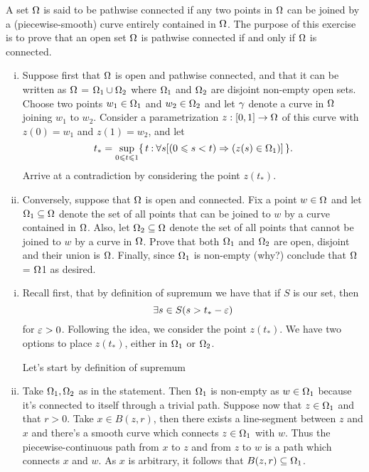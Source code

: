 \documentclass[12pt]{memoir}
\begin{document}
\begin{Ej}
    A set $\Omega$ is said to be pathwise connected if any two points in $\Omega$ can be joined by a (piecewise-smooth) curve entirely contained in $\Omega$. The purpose of this exercise is to prove that an open set $\Omega$ is pathwise connected if and only if $\Omega$ is connected.
    \begin{enumerate}[i)]
        \itemsep=-0.4em
        \item Suppose first that $\Omega$ is open and pathwise connected, and that it can be written as $\Omega$ = $\Omega_1\cup\Omega_2$ where $\Omega_1$ and $\Omega_2$ are disjoint non-empty open sets. Choose two points $w_1\in\Omega_1$ and $w_2\in\Omega_2$ and let $\gamma$ denote a curve in $\Omega$ joining $w_1$ to $w_2$. Consider a parametrization $z:\left\lbrack0,1\right\rbrack\to\Omega$ of this curve with $z(0) = w_1$ and $z(1) = w_2$, and let
        $$t_\ast = \sup_{0\leqslant t\leqslant 1}\{\,t\mathbin{:}\forall s [(0\leqslant s<t)\Rightarrow (z(s)\in\Omega_1)]\,\}.$$
        Arrive at a contradiction by considering the point $z(t_\ast)$.
        \item Conversely, suppose that $\Omega$ is open and connected. Fix a point $w\in\Omega$ and let $\Omega_1\subseteq\Omega$ denote the set of all points that can be joined to $w$ by a curve contained in $\Omega$. Also, let $\Omega_2\subseteq\Omega$ denote the set of all points that cannot be joined to $w$ by a curve in $\Omega$. Prove that both $\Omega_1$ and $\Omega_2$ are open, disjoint and their union is $\Omega$. Finally, since $\Omega_1$ is non-empty (why?) conclude that $\Omega$ = $\Omega$1 as desired.
    \end{enumerate}
    \end{Ej}

\begin{ptcbr}
    \begin{enumerate}[i)]
        \itemsep=-0.4em
        \item Recall first, that by definition of supremum we have that if $S$ is our set, then 
        $$\exists s\in S(s>t_\ast-\varepsilon)$$
        for $\varepsilon>0$. Following the idea, we consider the point $z(t_\ast)$. We have two options to place $z(t_\ast)$, either in $\Omega_1$ or $\Omega_2$.\par 
        Let's start by definition of supremum 
        \item Take $\Omega_1,\Omega_2$ as in the statement. Then $\Omega_1$ is non-empty as $w\in\Omega_1$ because it's connected to itself through a trivial path. Suppose now that $z\in\Omega_1$ and that $r>0$. Take $x\in B(z,r)$, then there exists a line-segment between $z$ and $x$ and there's a smooth curve which connects $z\in\Omega_1$ with $w$. Thus the piecewise-continuous path from $x$ to $z$ and from $z$ to $w$ is a path which connects $x$ and $w$. As $x$ is arbitrary, it follows that $B(z,r)\subseteq \Omega_1$.  
    \end{enumerate}
\end{ptcbr}
\end{document}
